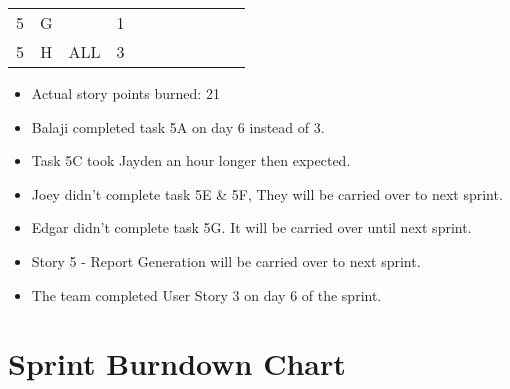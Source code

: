 \documentclass[12pt]{article}
\begin{document}
\begin{table}[H]
\begin{tabular}{@{}c|c|c|c|ccccccc@{}}
5     & G    &            & 1                                                      &                                                 &                                                 &                                                  &                                                  &                                                  &                                                  &                                                  \\ 
5     & H    & ALL        & 3                                                      &                                                 &                                                 &                                                  &                                                  &                                                  &                                                  &                                                  \\ \bottomrule
\end{tabular}
\end{table}

\begin{itemize}%
\item Actual story points burned: 21
\item Balaji completed task 5A on day 6 instead of 3.
\item Task 5C took Jayden an hour longer then expected.
\item Joey didn't complete task 5E \& 5F, They will be carried over to next sprint.
\item Edgar didn't complete task 5G. It will be carried over until next sprint.
\item Story 5 - Report Generation will be carried over to next sprint.
\item The team completed User Story 3 on day 6 of the sprint. 
\end{itemize}

\section{Sprint Burndown Chart}


\newpage


\end{document}
